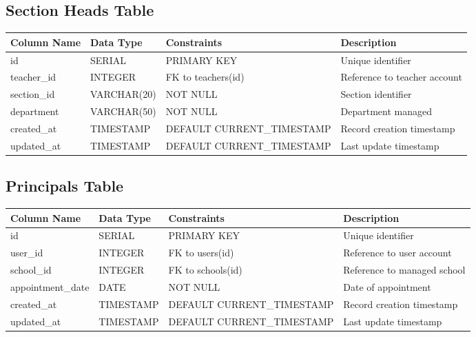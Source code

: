 \documentclass[11pt,a4paper]{article}
\begin{document}
\subsection{Section Heads Table}
\begin{longtable}{|p{3.5cm}|p{2.5cm}|p{3cm}|p{5.5cm}|}
\hline
\textbf{Column Name} & \textbf{Data Type} & \textbf{Constraints} & \textbf{Description} \\
\hline
\endhead
id & SERIAL & PRIMARY KEY & Unique identifier \\
\hline
teacher\_id & INTEGER & FK to teachers(id) & Reference to teacher account \\
\hline
section\_id & VARCHAR(20) & NOT NULL & Section identifier \\
\hline
department & VARCHAR(50) & NOT NULL & Department managed \\
\hline
created\_at & TIMESTAMP & DEFAULT CURRENT\_TIMESTAMP & Record creation timestamp \\
\hline
updated\_at & TIMESTAMP & DEFAULT CURRENT\_TIMESTAMP & Last update timestamp \\
\hline
\end{longtable}

\subsection{Principals Table}
\begin{longtable}{|p{3.5cm}|p{2.5cm}|p{3cm}|p{5.5cm}|}
\hline
\textbf{Column Name} & \textbf{Data Type} & \textbf{Constraints} & \textbf{Description} \\
\hline
\endhead
id & SERIAL & PRIMARY KEY & Unique identifier \\
\hline
user\_id & INTEGER & FK to users(id) & Reference to user account \\
\hline
school\_id & INTEGER & FK to schools(id) & Reference to managed school \\
\hline
appointment\_date & DATE & NOT NULL & Date of appointment \\
\hline
created\_at & TIMESTAMP & DEFAULT CURRENT\_TIMESTAMP & Record creation timestamp \\
\hline
updated\_at & TIMESTAMP & DEFAULT CURRENT\_TIMESTAMP & Last update timestamp \\
\hline
\end{longtable}
\end{document}
